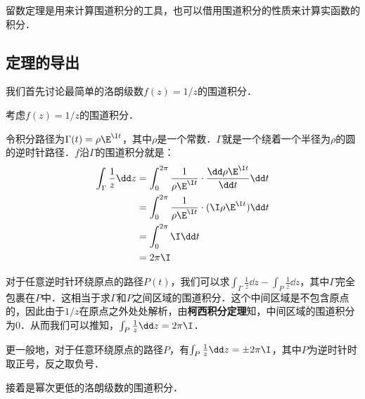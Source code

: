 

留数定理是用来计算围道积分的工具，也可以借用围道积分的性质来计算实函数的积分．

\subsection{定理的导出}

我们首先讨论最简单的洛朗级数$f(z)=1/z$的围道积分．

\begin{example}{}\label{ResThe_ex1}
考虑$f(z)=1/z$的围道积分．

令积分路径为$\Gamma(t)=\rho\E^{\I t}$，其中$\rho$是一个常数．$\Gamma$就是一个绕着一个半径为$\rho$的圆的逆时针路径．$f$沿$\Gamma$的围道积分就是：
\begin{equation}
\begin{aligned}
\int_{\Gamma}\frac{1}{z}\dd z&=\int^{2\pi}_0\frac{1}{\rho\E^{\I t}}\cdot\frac{\dd\rho\E^{\I t}}{\dd t}\dd t\\
&=\int_0^{2\pi}\frac{1}{\rho\E^{\I t}}\cdot (\I \rho \E^{\I t})\dd t\\
&=\int_0^{2\pi}\I\dd t\\
&=2\pi\I
\end{aligned}
\end{equation}

对于任意逆时针环绕原点的路径$P(t)$，我们可以求$\int_{\Gamma}\frac{1}{z}\dd z-\int_{P}\frac{1}{z}\dd z$，其中$\Gamma$完全包裹在$P$中．这相当于求$\Gamma$和$P$之间区域的围道积分．这个中间区域是不包含原点的，因此由于$1/z$在原点之外处处解析，由\textbf{柯西积分定理}知，中间区域的围道积分为$0$．从而我们可以推知，$\int_{P}\frac{1}{z}\dd z=2\pi\I$．

更一般地，对于任意环绕原点的路径$P$，有$\int_{P}\frac{1}{z}\dd z=\pm 2\pi\I$，其中$P$为逆时针时取正号，反之取负号．

\end{example}

接着是幂次更低的洛朗级数的围道积分．

